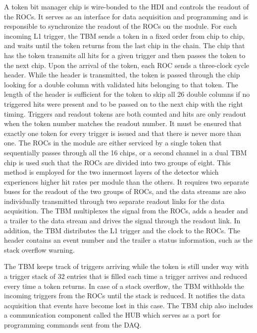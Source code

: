 A token bit manager chip is wire-bonded to the HDI and controls the readout of the ROCs.
It serves as an interface for data acquisition and programming and is responsible to synchronize the readout of the ROCs on the module.
For each incoming L1 trigger, the TBM sends a token in a fixed order from chip to chip, and waits until the token returns from the last chip in the chain.
The chip that has the token transmits all hits for a given trigger and then passes the token to the next chip.
Upon the arrival of the token, each ROC sends a three-clock cycle header.
While the header is transmitted, the token is passed through the chip looking for a double column with validated hits belonging to that token.
The length of the header is sufficient for the token to skip all 26 double columns if no triggered hits were present and to be passed on to the next chip with the right timing.
Triggers and readout tokens are both counted and hits are only readout when the token number matches the readout number.
It must be ensured that exactly one token for every trigger is issued and that there is never more than one.
The ROCs in the module are either serviced by a single token that sequentially passes through all the 16 chips, or a second channel in a dual TBM chip is used such that the ROCs are divided into two groups of eight.
This method is employed for the two innermost layers of the detector which experiences higher hit rates per module than the others.
It requires two separate buses for the readout of the two groups of ROCs, and the data streams are also individually transmitted through two separate readout links for the data acquisition. 
The TBM multiplexes the signal from the ROCs, adds a header and a trailer to the data stream and drives the signal through the readout link. In addition, the TBM distributes the L1 trigger and the clock to the ROCs.
The header contains an event number and the trailer a status information, such as the stack overflow warning.

The TBM keeps track of triggers arriving while the token is still under way with a trigger stack of 32 entries that is filled each time a trigger arrives and reduced every time a token returns.
In case of a stack overflow, the TBM withholds the incoming triggers from the ROCs until the stack is reduced. It notifies the data acquisition that events have become lost in this case.
The TBM chip also includes a communication component called the HUB which serves as a port for programming commands sent from the DAQ.


